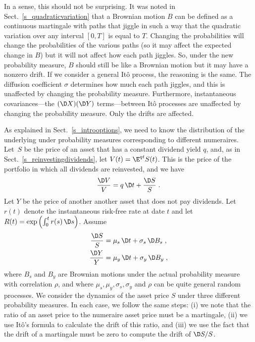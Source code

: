 In a sense, this should not be surprising.  It was noted in Sect.~\ref{s_quadraticvariation} that a Brownian motion $B$ can be defined as a continuous martingale with paths that jiggle in such a way that the quadratic variation over any interval $[0,T]$ is equal to $T$.  Changing the probabilities will change the probabilities of the various paths (so it may affect the expected change in $B$) but it will not affect how each path jiggles. So, under the new probability measure, $B$ should still be like a Brownian motion but it may have a nonzero drift.  If we consider a general It\^o process, the reasoning is the same.  The diffusion coefficient $\sigma$ determines how much each path jiggles, and this is unaffected by changing the probability measure.  Furthermore, instantaneous covariances---the $(\D X)(\D Y)$ terms---between It\^o processes are unaffected by changing the probability measure.  Only the drifts are affected.

As explained in Sect.~\ref{s_introoptions}, we need to know the distribution of the underlying under probability measures corresponding to different numeraires.  Let~$S$ be the price of an asset that has a constant dividend yield $q$, and, as in Sect.~\ref{s_reinvestingdividends}, let $V(t)=\E^{qt}S(t)$.  This is the price of the portfolio in which all dividends are reinvested, and we have 
$$\frac{\D V}{V} = q\,\D t + \frac{\D S}{S}\; .$$
Let $Y$ be the price of another another asset that does not pay dividends.  Let~$r(t)$ denote the instantaneous risk-free rate at date $t$ and let $R(t) = \exp\left(\int_0^t r(s)\,\D s\right)$.  Assume
\begin{align*}
 \frac{\D S}{S} &= \mu_s\,\D t+\sigma_s\,\D B_s\; ,\\
 \frac{\D Y}{Y} &= \mu_y\,\D t+\sigma_y\,\D B_y\;,
\end{align*}
where $B_s$ and $B_y$ are Brownian motions under the actual probability measure with correlation $\rho$, and where $\mu_s, \mu_y, \sigma_s, \sigma_y$ and $\rho$ can be quite general random pro\-cesses.  
We consider the dynamics of the asset price $S$ under three different probability measures.  In each case, we follow the same steps: (i) we note that the ratio of an asset price to the numeraire asset price must be a martingale, (ii) we use It\^o's formula to calculate the drift of this ratio, and (iii) we use the fact that the drift of a martingale must be zero to compute the drift of $\D S/S$.


